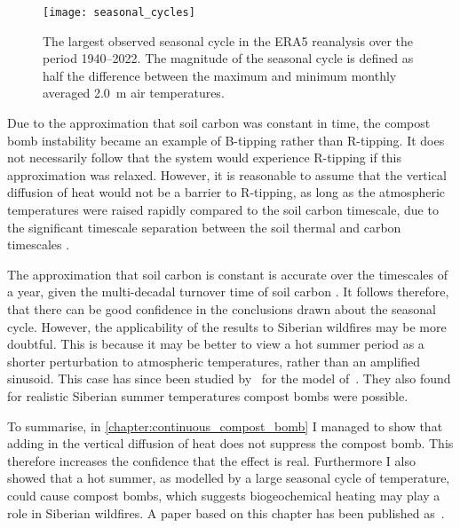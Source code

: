 \begin{figure}
  \centering
  \texttt{[image: seasonal\_cycles]}
  \caption[Map of Seasonal Cycles]{The largest observed seasonal cycle in the ERA5 reanalysis \parencite{Hersbach2020} over the period 1940--2022.
    The magnitude of the seasonal cycle is defined as half the difference between the maximum and minimum monthly averaged \SI{2.0}{\meter} air temperatures.}
  \label{fig:seasonal_cycle_maps}
\end{figure}

Due to the approximation that soil carbon was constant in time, the compost bomb instability became an example of B-tipping rather than R-tipping. It does not necessarily
follow that the system would experience R-tipping if this approximation was relaxed. However, it is reasonable to assume that the vertical diffusion of heat would not be a barrier to
R-tipping, as long as the atmospheric temperatures were raised rapidly compared to the soil carbon timescale, due to the significant timescale separation between the soil thermal and
carbon timescales \parencite{Luke2011}.

The approximation that soil carbon is constant is accurate over the timescales of a year, given the multi-decadal turnover time of soil carbon \parencite{Varney2020}.
It follows therefore, that there can be good confidence in the conclusions drawn about the seasonal cycle. However, the applicability of the results to Siberian wildfires may be more doubtful.
This is because it may be better to view a hot summer period as a shorter perturbation to atmospheric temperatures, rather than an amplified sinusoid. This case has
since been studied by~\cite{OSullivan2023} for the model of~\cite{Luke2011}. They also found for realistic Siberian summer temperatures compost bombs were possible. 

To summarise, in \cref{chapter:continuous_compost_bomb} I managed to show that adding in the vertical diffusion of heat does not suppress the compost bomb. This therefore increases the confidence
that the effect is real. Furthermore I also showed that a hot summer, as modelled by a large seasonal cycle of temperature, could cause compost bombs, which suggests biogeochemical heating may
play a role in Siberian wildfires. A paper based on this chapter has been published as~\cite{Clarke2021}.

\subsubsection{}

